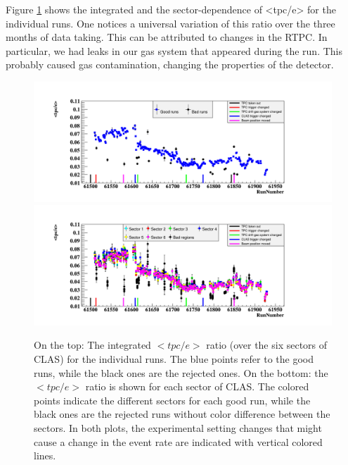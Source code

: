 Figure \ref{fig:tpc_over_e_Run_sec.png} shows the integrated and the 
sector-dependence of <tpc/e> for the individual runs. One notices a universal 
variation of this ratio over the three months of data taking. This can be 
attributed to changes in the RTPC. In particular, we had leaks in our gas 
system that appeared during the run. This probably caused gas contamination, 
changing the properties of the detector.



\begin{figure}[h!]
\hspace*{-0.3in}\includegraphics[scale=0.45]{fig_dvcs/tpc_over_e_Run.png}
\hspace*{-0.3in}\includegraphics[scale=0.45]{fig_dvcs/tpc_over_e_Run_sec.png}
\caption{On the top: The integrated $<tpc/e>$ ratio (over the six sectors of 
   CLAS) for the individual runs. The blue points refer to the good runs, while 
   the black ones are the rejected ones. On the bottom: the $<tpc/e>$ ratio is 
   shown for each sector of CLAS. The colored points indicate the different 
   sectors for each good run, while the black ones are the rejected runs 
without color difference between the sectors. In both plots, the experimental 
setting changes that might cause a change in the event rate are indicated with 
vertical colored lines.} \label{fig:tpc_over_e_Run_sec.png}
\end{figure}

